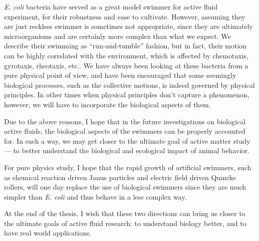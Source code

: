 \textit{E. coli} bacteria have served as a great model swimmer for active fluid experiment, for their robustness and ease to cultivate. However, assuming they are just reckless swimmer is sometimes not appropriate, since they are ultimately microorganisms and are certainly more complex than what we expect. We describe their swimming as ``run-and-tumble'' fashion, but in fact, their motion can be highly correlated with the environment, which is affected by chemotaxis, gyrotaxis, rheotaxis, etc.. We have always been looking at these bacteria from a pure physical point of view, and have been encouraged that some seemingly biological processes, such as the collective motions, is indeed governed by physical principles. In other times when physical principles don't capture a phenomenon, however, we will have to incorporate the biological aspects of them.

Due to the above reasons, I hope that in the future investigations on biological active fluids, the biological aspects of the swimmers can be properly accounted for. In such a way, we may get closer to the ultimate goal of active matter study --- to better understand the biological and ecological impact of animal behavior.

For pure physics study, I hope that the rapid growth of artificial swimmers, such as chemical reaction driven Janus particles and electric field driven Quincke rollers, will one day replace the use of biological swimmers since they are much simpler than \textit{E. coli} and thus behave in a less complex way.

At the end of the thesis, I wish that these two directions can bring us closer to the ultimate goals of active fluid research: to understand biology better, and to have real world applications.
